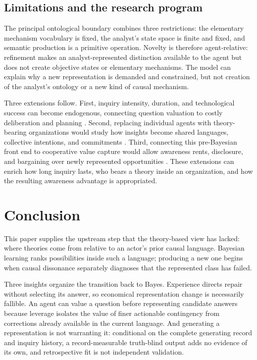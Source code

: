 \documentclass[11pt]{article}
\theoremstyle{definition}
\begin{document}
\subsection{Limitations and the research program}

The principal ontological boundary combines three restrictions: the elementary mechanism vocabulary is fixed, the analyst's state space is finite and fixed, and semantic production is a primitive operation.
Novelty is therefore agent-relative: refinement makes an analyst-represented distinction available to the agent but does not create objective states or elementary mechanisms.
The model can explain why a new representation is demanded and constrained, but not creation of the analyst's ontology or a new kind of causal mechanism.

Three extensions follow.
First, inquiry intensity, duration, and technological success can become endogenous, connecting question valuation to costly deliberation and planning \citep{RyallAction2026}.
Second, replacing individual agents with theory-bearing organizations would study how insights become shared languages, collective intentions, and commitments \citep{RyallWilkins2018}.
Third, connecting this pre-Bayesian front end to cooperative value capture would allow awareness rents, disclosure, and bargaining over newly represented opportunities \citep{GansRyall2017,BryanRyallSchipper2022}.
These extensions can enrich how long inquiry lasts, who bears a theory inside an organization, and how the resulting awareness advantage is appropriated.

\section{Conclusion}
\label{sec:conclusion}

This paper supplies the upstream step that the theory-based view has lacked: where theories come from relative to an actor's prior causal language.
Bayesian learning ranks possibilities inside such a language; producing a new one begins when causal dissonance separately diagnoses that the represented class has failed.

Three insights organize the transition back to Bayes.
Experience directs repair without selecting its answer, so economical representation change is necessarily fallible.
An agent can value a question before representing candidate answers because leverage isolates the value of finer actionable contingency from corrections already available in the current language.
And generating a representation is not warranting it: conditional on the complete generating record and inquiry history, a record-measurable truth-blind output adds no evidence of its own, and retrospective fit is not independent validation.
\end{document}

